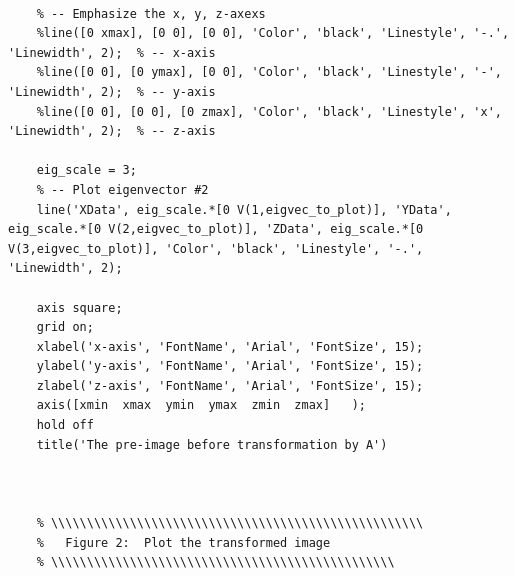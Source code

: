 \documentclass{article}
\begin{document}
\begin{verbatim}
	
	% -- Emphasize the x, y, z-axexs
	%line([0 xmax], [0 0], [0 0], 'Color', 'black', 'Linestyle', '-.', 'Linewidth', 2);  % -- x-axis
	%line([0 0], [0 ymax], [0 0], 'Color', 'black', 'Linestyle', '-', 'Linewidth', 2);  % -- y-axis
	%line([0 0], [0 0], [0 zmax], 'Color', 'black', 'Linestyle', 'x', 'Linewidth', 2);  % -- z-axis
	
	eig_scale = 3;
	% -- Plot eigenvector #2
	line('XData', eig_scale.*[0 V(1,eigvec_to_plot)], 'YData', eig_scale.*[0 V(2,eigvec_to_plot)], 'ZData', eig_scale.*[0 V(3,eigvec_to_plot)], 'Color', 'black', 'Linestyle', '-.', 'Linewidth', 2);
	
	axis square;
	grid on;
	xlabel('x-axis', 'FontName', 'Arial', 'FontSize', 15);
	ylabel('y-axis', 'FontName', 'Arial', 'FontSize', 15);
	zlabel('z-axis', 'FontName', 'Arial', 'FontSize', 15);
	axis([xmin  xmax  ymin  ymax  zmin  zmax]   );
	hold off
	title('The pre-image before transformation by A')
	
	
	
	% \\\\\\\\\\\\\\\\\\\\\\\\\\\\\\\\\\\\\\\\\\\\\\\\\\\\
	%   Figure 2:  Plot the transformed image
	% \\\\\\\\\\\\\\\\\\\\\\\\\\\\\\\\\\\\\\\\\\\\\\\\
	

\end{verbatim}
\end{document}
